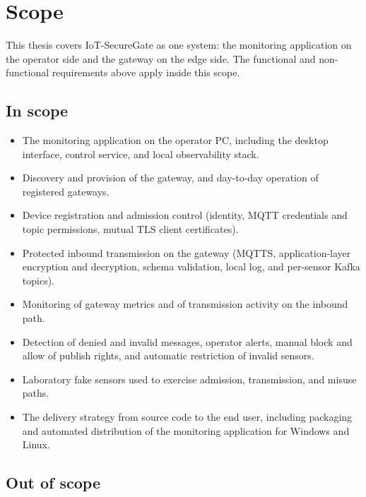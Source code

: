 \documentclass[12pt,a4paper]{report}
\begin{document}
\section{Scope}
\label{sec:scope}

This thesis covers IoT-SecureGate as one system: the
monitoring application on the operator side and the
gateway on the edge side. The functional and
non-functional requirements above apply inside this
scope.

\subsection{In scope}

\begin{itemize}
    \item The monitoring application on the operator PC,
    including the desktop interface, control service, and
    local observability stack.
    \item Discovery and provision of the gateway,
    and day-to-day operation of registered gateways.
    \item Device registration and admission control
    (identity, MQTT credentials and topic permissions,
    mutual TLS client certificates).
    \item Protected inbound transmission on the gateway
    (MQTTS, application-layer encryption and decryption,
    schema validation, local log, and per-sensor Kafka
    topics).
    \item Monitoring of gateway metrics and of
    transmission activity on the inbound path.
    \item Detection of denied and invalid messages,
    operator alerts, manual block and allow of publish
    rights, and automatic restriction of invalid sensors.
    \item Laboratory fake sensors used to exercise
    admission, transmission, and misuse paths.
    \item The delivery strategy from source code to the
    end user, including packaging and automated
    distribution of the monitoring application for
    Windows and Linux.
\end{itemize}

\subsection{Out of scope}
\end{document}
